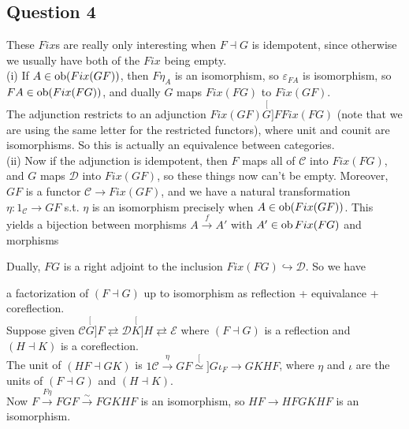 \documentclass[a4paper]{article}
\begin{document}
\subsection{Question 4}
These $Fix$s are really only interesting when $F \dashv G$ is idempotent, since otherwise we usually have both of the $Fix$ being empty.\\
(i) If $A \in \operatorname{ob}(Fix(GF))$, then $F\eta_A$ is an isomorphism, so $\varepsilon_{FA}$ is isomorphism, so $FA \in \operatorname{ob}(Fix(FG))$, and dually $G$ maps $Fix(FG)$ to $Fix(GF)$.\\
The adjunction restricts to an adjunction $Fix(GF) \stackrel[G]{F} Fix(FG)$ (note that we are using the same letter for the restricted functors), where unit and counit are isomorphisms. So this is actually an equivalence between categories.\\
(ii) Now if the adjunction is idempotent, then $F$ maps all of $\mathcal{C}$ into $Fix(FG)$, and $G$ maps $\mathcal{D}$ into $Fix(GF)$, so these things now can't be empty. Moreover, $GF$ is a functor $\mathcal{C} \to Fix(GF)$, and we have a natural transformation $\eta:1_\mathcal{C} \to GF$ s.t. $\eta$ is an isomorphism precisely when $A \in \operatorname{ob}(Fix(GF))$. This yields a bijection between morphisms $A \xrightarrow{f} A'$ with $A' \in \operatorname{ob} Fix(FG)$ and morphisms
Dually, $FG$ is a right adjoint to the inclusion $Fix(FG) \hookrightarrow \mathcal{D}$. So we have


a factorization of $(F \dashv G)$ up to isomorphism as reflection + equivalance + coreflection.\\
Suppose given $\mathcal{C} \stackrel[G]{F}{\rightleftarrows} \mathcal{D} \stackrel[K]{H}{\rightleftarrows} \mathcal{E}$ where $(F\dashv G)$ is a reflection and $(H \dashv K)$ is a coreflection.\\
The unit of $(HF \dashv GK)$ is $1\mathcal{C} \xrightarrow{\eta} GF \stackrel[\simeq]{G\iota_F}{\longrightarrow} GKHF$, where $\eta$ and $\iota$ are the units of $(F\dashv G)$ and $(H \dashv K)$.\\
Now $F \xrightarrow{F\eta} FGF \xrightarrow{\sim} FGKHF$ is an isomorphism, so $HF \to HFGKHF$ is an isomorphism.
\end{document}
